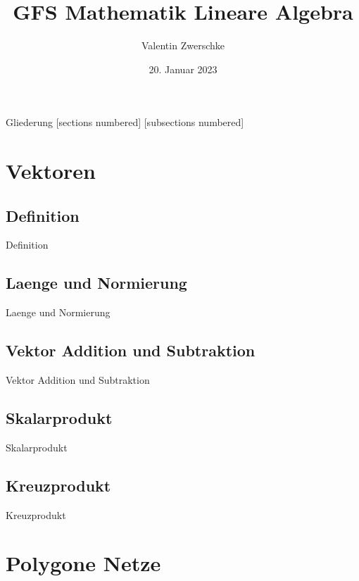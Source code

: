 \documentclass[10pt,aspectratio=169]{beamer}
\title{GFS Mathematik Lineare Algebra}
\date{20. Januar 2023}
\author{Valentin Zwerschke}
\institute{Königin-Olga-Stift Gymnasium}
\begin{document}
  \maketitle

  \begin{frame}{Gliederung}
	[sections numbered]
	[subsections numbered]
	\tableofcontents[hideallsubsections]
  \end{frame}

  \section{Vektoren}
  \subsection{Definition}
  \begin{frame}{Definition}
  \end{frame}


  \subsection{Laenge und Normierung}
  \begin{frame}{Laenge und Normierung}
  \end{frame}

  \subsection{Vektor Addition und Subtraktion}
  \begin{frame}{Vektor Addition und Subtraktion}
  \end{frame}


  \subsection{Skalarprodukt}
  \begin{frame}{Skalarprodukt}
  \end{frame}

  \subsection{Kreuzprodukt}
  \begin{frame}{Kreuzprodukt}
  \end{frame}

  \section{Polygone Netze}
\end{document}
